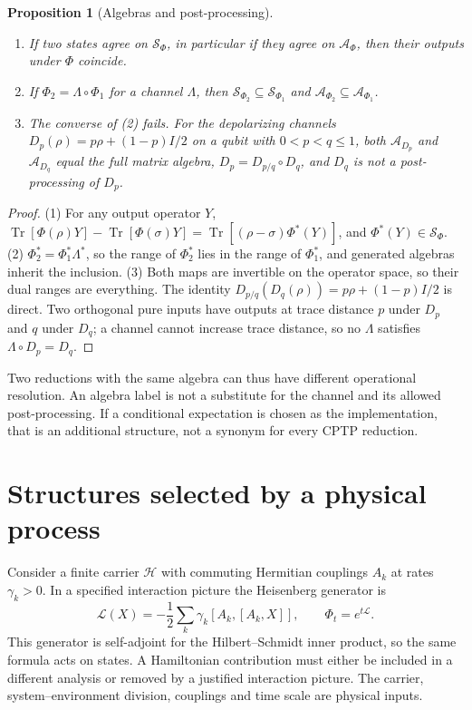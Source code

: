 \documentclass[12pt,a4paper]{article}
\newtheorem{proposition}[theorem]{Proposition}
\begin{document}
\begin{proposition}[Algebras and post-processing]
\label{prop:algebra}
\begin{enumerate}
\item If two states agree on $\mathcal S_\Phi$, in particular if they agree on $\mathcal A_\Phi$, then their outputs under $\Phi$ coincide.
\item If $\Phi_2=\Lambda\circ\Phi_1$ for a channel $\Lambda$, then $\mathcal S_{\Phi_2}\subseteq\mathcal S_{\Phi_1}$ and $\mathcal A_{\Phi_2}\subseteq\mathcal A_{\Phi_1}$.
\item The converse of (2) fails. For the depolarizing channels $D_p(\rho)=p\rho+(1-p)I/2$ on a qubit with $0<p<q\le1$, both $\mathcal A_{D_p}$ and $\mathcal A_{D_q}$ equal the full matrix algebra, $D_p=D_{p/q}\circ D_q$, and $D_q$ is not a post-processing of $D_p$.
\end{enumerate}
\end{proposition}

\begin{proof}
(1) For any output operator $Y$, $\operatorname{Tr}[\Phi(\rho)Y]-\operatorname{Tr}[\Phi(\sigma)Y]=\operatorname{Tr}[(\rho-\sigma)\Phi^*(Y)]$, and $\Phi^*(Y)\in\mathcal S_\Phi$. (2) $\Phi_2^*=\Phi_1^*\Lambda^*$, so the range of $\Phi_2^*$ lies in the range of $\Phi_1^*$, and generated algebras inherit the inclusion. (3) Both maps are invertible on the operator space, so their dual ranges are everything. The identity $D_{p/q}(D_q(\rho))=p\rho+(1-p)I/2$ is direct. Two orthogonal pure inputs have outputs at trace distance $p$ under $D_p$ and $q$ under $D_q$; a channel cannot increase trace distance, so no $\Lambda$ satisfies $\Lambda\circ D_p=D_q$.
\end{proof}

Two reductions with the same algebra can thus have different operational resolution. An algebra label is not a substitute for the channel and its allowed post-processing. If a conditional expectation is chosen as the implementation, that is an additional structure, not a synonym for every CPTP reduction.

\section{Structures selected by a physical process}
\label{sec:interfaces}

Consider a finite carrier $\mathcal H$ with commuting Hermitian
couplings $A_k$ at rates $\gamma_k>0$. In a specified interaction
picture the Heisenberg generator is
\begin{equation}
 \mathcal L(X)=-\frac12\sum_k\gamma_k[A_k,[A_k,X]],
 \qquad \Phi_t=e^{t\mathcal L}.
 \label{eq:process-generator}
\end{equation}
This generator is self-adjoint for the Hilbert--Schmidt inner product,
so the same formula acts on states. A Hamiltonian contribution must
either be included in a different analysis or removed by a justified
interaction picture. The carrier, system--environment division,
couplings and time scale are physical inputs.
\end{document}
